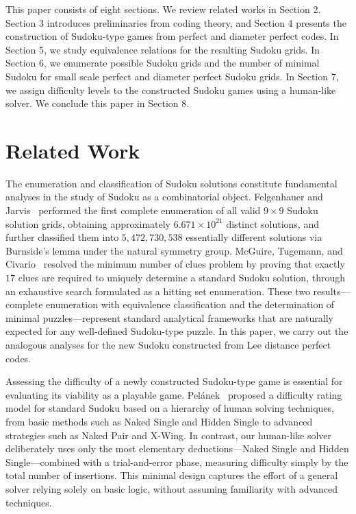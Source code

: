 \documentclass{article}
\theoremstyle{definition}
\begin{document}
This paper consists of eight sections. We review related works in Section 2. Section 3 introduces preliminaries from coding theory, and Section 4 presents the construction of Sudoku-type games from perfect and diameter perfect codes. In Section 5, we study equivalence relations for the resulting Sudoku grids. In Section 6, we enumerate possible Sudoku grids and the number of minimal Sudoku for small scale perfect and diameter perfect Sudoku grids. In Section 7, we assign difficulty levels to the constructed Sudoku games using a human-like solver. We conclude this paper in Section 8.

\section{Related Work}

The enumeration and classification of Sudoku solutions constitute fundamental analyses in the study of Sudoku as a combinatorial object. Felgenhauer and Jarvis~\cite{FJ06} performed the first complete enumeration of all valid $9 \times 9$ Sudoku solution grids, obtaining approximately $6.671 \times 10^{21}$ distinct solutions, and further classified them into $5{,}472{,}730{,}538$ essentially different solutions via Burnside's lemma under the natural symmetry group. McGuire, Tugemann, and Civario~\cite{MTC14} resolved the minimum number of clues problem by proving that exactly $17$ clues are required to uniquely determine a standard Sudoku solution, through an exhaustive search formulated as a hitting set enumeration. These two results---complete enumeration with equivalence classification and the determination of minimal puzzles---represent standard analytical frameworks that are naturally expected for any well-defined Sudoku-type puzzle. In this paper, we carry out the analogous analyses for the new Sudoku constructed from Lee distance perfect codes.

Assessing the difficulty of a newly constructed Sudoku-type game is essential for evaluating its viability as a playable game. Pel\'{a}nek~\cite{Pel14} proposed a difficulty rating model for standard Sudoku based on a hierarchy of human solving techniques, from basic methods such as Naked Single and Hidden Single to advanced strategies such as Naked Pair and X-Wing. In contrast, our human-like solver deliberately uses only the most elementary deductions---Naked Single and Hidden Single---combined with a trial-and-error phase, measuring difficulty simply by the total number of insertions. This minimal design captures the effort of a general solver relying solely on basic logic, without assuming familiarity with advanced techniques.
\end{document}
